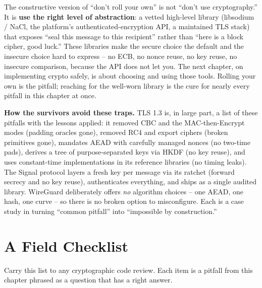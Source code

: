 \begin{focusbox}
The constructive version of ``don't roll your own'' is not ``don't use cryptography.'' It is \textbf{use the right level of abstraction}: a vetted high-level library (libsodium / NaCl, the platform's authenticated-encryption API, a maintained TLS stack) that exposes ``seal this message to this recipient'' rather than ``here is a block cipher, good luck.'' These libraries make the secure choice the default and the insecure choice hard to express -- no ECB, no nonce reuse, no key reuse, no insecure comparison, because the API does not let you. The next chapter, on implementing crypto safely, is about choosing and using those tools. Rolling your own is the pitfall; reaching for the well-worn library is the cure for nearly every pitfall in this chapter at once.
\end{focusbox}

\begin{applicationbox}
\textbf{How the survivors avoid these traps.} TLS 1.3 is, in large part, a list of these pitfalls with the lessons applied: it removed CBC and the MAC-then-Encrypt modes (padding oracles gone), removed RC4 and export ciphers (broken primitives gone), mandates AEAD with carefully managed nonces (no two-time pads), derives a tree of purpose-separated keys via HKDF (no key reuse), and uses constant-time implementations in its reference libraries (no timing leaks). The Signal protocol layers a fresh key per message via its ratchet (forward secrecy and no key reuse), authenticates everything, and ships as a single audited library. WireGuard deliberately offers \emph{no} algorithm choices -- one AEAD, one hash, one curve -- so there is no broken option to misconfigure. Each is a case study in turning ``common pitfall'' into ``impossible by construction.''
\end{applicationbox}

\section{A Field Checklist}
\label{ch38:checklist}

Carry this list to any cryptographic code review. Each item is a pitfall from this chapter phrased as a question that has a right answer.

